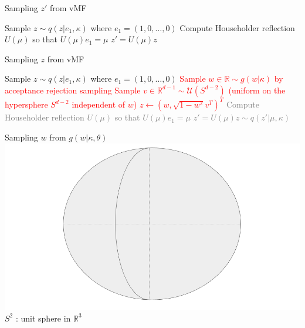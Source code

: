 \begin{frame}{Sampling $z'$ from vMF}
  \begin{algorithm}[H]
    \caption{Overview of the sampling method from $vMF(\mu, \kappa)$}\label{alg:overviewsampling}
    \begin{algorithmic}[1]
      \STATE Sample $z \sim q(z| e_1, \kappa)$ where $e_1 = (1, 0, \dots, 0)$
      \STATE Compute Householder reflection $U(\mu)$ so that $U(\mu) e_1 = \mu$
      \RETURN $z' = U(\mu) z$
    \end{algorithmic}
    \end{algorithm}
  \end{frame}

  \begin{frame}{Sampling $z$ from vMF}
    \begin{algorithm}[H]
      \caption{Overview of the sampling method from $vMF(\mu, \kappa)$}\label{alg:overviewsampling2}
      \begin{algorithmic}[1]
        \STATE Sample $z \sim q(z| e_1, \kappa)$ where $e_1 = (1, 0, \dots, 0)$
        \textcolor{red}{
          \STATE Sample $w \in \mathbb{R} \sim g(w |\kappa)$ by acceptance rejection sampling
          \STATE Sample $v \in \mathbb{R}^{d-1} \sim \mathcal{U}(S^{d-2})$ (uniform on the hypersphere $S^{d-2}$ independent of $w$)
          \STATE $z \gets (w, \sqrt{1 - w^2}v^T)^T$
        }
        \textcolor{gray}{
        \STATE Compute Householder reflection $U(\mu)$ so that $U(\mu) e_1 = \mu$
        \RETURN $z' = U(\mu) z \sim q(z' | \mu, \kappa)$}
      \end{algorithmic}
      \end{algorithm}
    \end{frame}
  
\begin{frame}{Sampling $w$ from $g(w|\kappa, \theta)$}
  \centering
  \includegraphics[width=\textwidth]{figures/illustration_sampling_1.png}
  $S^{2}$ : unit sphere in $\mathbb{R}^{3}$
\end{frame}

